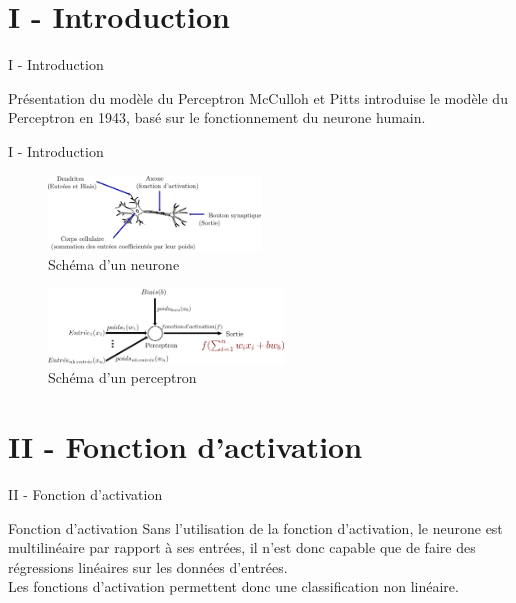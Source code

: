 \documentclass[10pt]{beamer}
\begin{document}
\section{I - Introduction}
\begin{frame}{I - Introduction}
\begin{block}{Présentation du modèle du Perceptron}
McCulloh et Pitts introduise le modèle du Perceptron en 1943, basé sur le fonctionnement du neurone humain.
\end{block}
\end{frame}

\begin{frame}{I - Introduction}
\begin{figure}
	\centering
    \includegraphics[height=75px]{2-Neurone.png}
	\caption{Schéma d'un neurone}	
\end{figure}
\begin{figure}
	\centering
    \includegraphics[height=75px]{1-Perceptron.png}
	\caption{Schéma d'un perceptron}	
\end{figure}
\end{frame}

\section{II - Fonction d'activation}
\begin{frame}{II - Fonction d'activation}
\begin{block}{Fonction d'activation}
Sans l'utilisation de la fonction d'activation, le neurone est multilinéaire par rapport à ses entrées, il n'est donc capable que de faire des régressions linéaires sur les données d'entrées. \\
Les fonctions d'activation permettent donc une classification non linéaire.
\end{block}
\end{frame}
\end{document}
